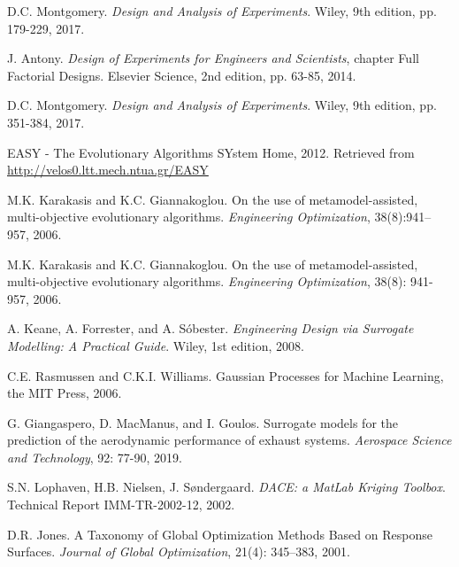 D.C. Montgomery. \textit{Design and Analysis of Experiments}. 
Wiley, 9th edition, pp. 179-229, 2017.


J. Antony. \textit{Design of Experiments for Engineers and 
Scientists}, chapter Full Factorial Designs. Elsevier 
Science, 2nd edition, pp. 63-85, 2014.

D.C. Montgomery. \textit{Design and Analysis of Experiments}. 
Wiley, 9th edition, pp. 351-384, 2017.

EASY - The Evolutionary Algorithms SYstem Home, 2012. 
Retrieved from \url{http://velos0.ltt.mech.ntua.gr/EASY}

M.K. Karakasis and K.C. Giannakoglou. On the use of 
metamodel-assisted, multi-objective evolutionary algorithms. 
\textit{Engineering Optimization}, 38(8):941–957, 2006.

M.K. Karakasis and K.C. Giannakoglou. On the use of 
metamodel-assisted, multi-objective evolutionary 
algorithms. \textit{Engineering Optimization}, 38(8): 
941-957, 2006.

A. Keane, A. Forrester, and A. Sóbester. 
\textit{Engineering Design via Surrogate Modelling: A 
Practical Guide}. Wiley, 1st edition, 2008.
  
C.E. Rasmussen and C.K.I. Williams. Gaussian Processes 
for Machine Learning, the MIT Press, 2006.
  
G. Giangaspero, D. MacManus, and I. Goulos. Surrogate 
models for the prediction of the aerodynamic performance 
of exhaust systems. \textit{Aerospace Science and 
Technology}, 92: 77-90, 2019.

S.N. Lophaven, H.B. Nielsen, J. Søndergaard. \textit{DACE: 
a MatLab Kriging Toolbox}. Technical Report IMM-TR-2002-12, 
2002.

D.R. Jones. A Taxonomy of Global Optimization Methods Based on
Response Surfaces. \textit{Journal of Global Optimization}, 21(4): 
345–383, 2001.

